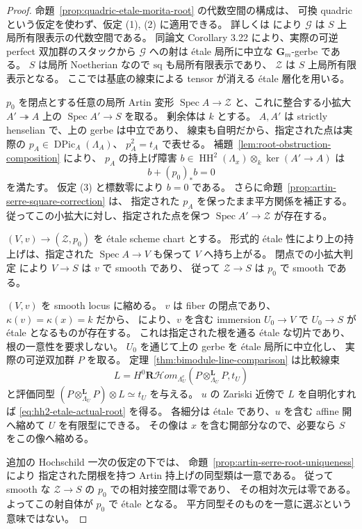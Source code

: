 \begin{proof}
命題~\ref{prop:quadric-etale-morita-root} の代数空間の構成は、
可換 quadric という仮定を使わず、仮定 (1), (2) に適用できる。
詳しくは \cite[著者公開版 April 2007, Corollary 3.24,
Lemma 3.25]{TV2007} により $\mathcal G$ は $S$ 上局所有限表示の代数空間である。
同論文 Corollary 3.22 により、実際の可逆 perfect 双加群のスタックから
$\mathcal G$ への射は étale 局所に中立な $\mathbf G_m$-gerbe である。
$S$ は局所 Noetherian なので $\mathrm{sq}$ も局所有限表示であり、
$\mathcal Z$ は $S$ 上局所有限表示となる。
ここでは基底の線束による tensor が消える étale 層化を用いる。

$p_0$ を閉点とする任意の局所 Artin 変形
$\operatorname{Spec} A\to\mathcal Z$ と、これに整合する小拡大
$A'\twoheadrightarrow A$ 上の $\operatorname{Spec} A'\to S$ を取る。
剰余体は $k$ とする。
$A,A'$ は strictly henselian で、上の gerbe は中立であり、
線束も自明だから、指定された点は実際の
$p_A\in\operatorname{DPic}_A(\Lambda_A)$、
$p_A^2=t_A$ で表せる。
補題~\ref{lem:root-obstruction-composition} により、
$p_A$ の持上げ障害
$b\in\operatorname{HH}^2(\Lambda_x)\otimes_k\ker(A'\to A)$ は
\[
 b+(p_0)_*b=0
\]
を満たす。
仮定 (3) と標数零により $b=0$ である。
さらに命題~\ref{prop:artin-serre-square-correction} は、
指定された $p_A$ を保ったまま平方関係を補正する。
従ってこの小拡大に対し、指定された点を保つ
$\operatorname{Spec} A'\to\mathcal Z$ が存在する。

$(V,v)\to(\mathcal Z,p_0)$ を étale scheme chart とする。
形式的 étale 性により上の持上げは、指定された
$\operatorname{Spec} A\to V$ も保って $V$ へ持ち上がる。
閉点での小拡大判定
\cite[Tag 02HX, Lemma 37.12.1]{StacksSmoothAtlas}
により $V\to S$ は $v$ で smooth であり、
従って $\mathcal Z\to S$ は $p_0$ で smooth である。

$(V,v)$ を smooth locus に縮める。
$v$ は fiber の閉点であり、$\kappa(v)=\kappa(x)=k$ だから、
\cite[Tag 057G, Lemma 37.38.5]{StacksSmoothAtlas}
により、$v$ を含む immersion $U_0\to V$ で
$U_0\to S$ が étale となるものが存在する。
これは指定された根を通る étale な切片であり、
根の一意性を要求しない。
$U_0$ を通じて上の gerbe を étale 局所に中立化し、
実際の可逆双加群 $P$ を取る。
定理~\ref{thm:bimodule-line-comparison} は比較線束
\[
 L=H^0\mathbf R\mathcal Hom_{\Lambda_U^e}
       (P\otimes_{\Lambda_U}^{\mathbf L}P,t_U)
\]
と評価同型
$(P\otimes_{\Lambda_U}^{\mathbf L}P)\otimes L\simeq t_U$
を与える。
$u$ の Zariski 近傍で $L$ を自明化すれば
\eqref{eq:hh2-etale-actual-root} を得る。
各細分は étale であり、$u$ を含む affine 開へ縮めて
$U$ を有限型にできる。
その像は $x$ を含む開部分なので、必要なら $S$ をこの像へ縮める。

追加の Hochschild 一次の仮定の下では、
命題~\ref{prop:artin-serre-root-uniqueness} により
指定された閉根を持つ Artin 持上げの同型類は一意である。
従って smooth な $\mathcal Z\to S$ の $p_0$ での相対接空間は零であり、
その相対次元は零である。よってこの射自体が $p_0$ で étale となる。
平方同型そのものを一意に選ぶという意味ではない。
\end{proof}

